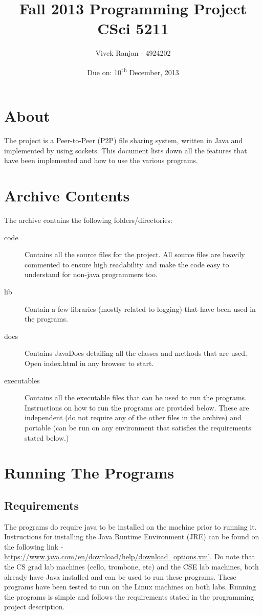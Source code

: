 \documentclass[12pt,twosided,a4paper]{article}
\title{
\Huge \textbf{Fall 2013 Programming Project}\\[3pt]
\large \textbf{CSci 5211}
}
\author{Vivek Ranjan - 4924202}
\date{Due on: 10\textsuperscript{th} December, 2013}
\numberwithin{equation}{section} %
\numberwithin{figure}{section} %
\numberwithin{table}{section} %
\begin{document}
	\maketitle
\thispagestyle{empty}


\tableofcontents
\newpage

\section{About}
The project is a Peer-to-Peer (P2P) file sharing system, written in Java and
implemented by using sockets. This document lists down all the features that have been
implemented and how to use the various programs.

\section{Archive Contents}
The archive contains the following folders/directories:
\begin{description}
\item[code]	Contains all the source files for the project. All source files are
heavily commented to ensure high readability and make the code easy to
understand for non-java programmers too.
\item[lib] Contain a few libraries (mostly related to logging) that have been
used in the programs.
\item[docs] Contains JavaDocs detailing all the classes and methods that are
used. Open index.html in any browser to start.
\item[executables] Contains all the executable files that can be used to run the
programs. Instructions on how to run the programs are provided below. These are
independent (do not require any of the other files in the archive) and portable
(can be run on any environment that satisfies the requirements stated below.)
\end{description}

\section{Running The Programs}
\subsection{Requirements}
The programs do require java to be installed on
the machine prior to running it. Instructions for installing the Java Runtime
Environment (JRE) can be found on the following link -
\url{https://www.java.com/en/download/help/download_options.xml}. 
Do note that the CS grad lab machines (cello, trombone, etc) and the CSE
lab machines, both already have Java installed and can be used to run these
programs. These programs have been tested to run on the Linux machines on both
labs.
\newline
Running the programs is simple and follows the requirements stated in the
programming project description. 
\end{document}
